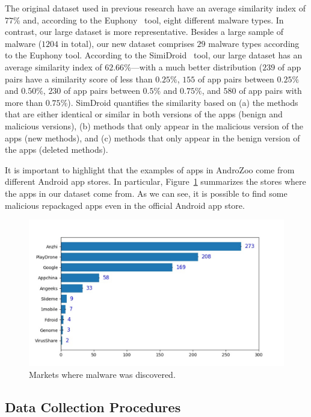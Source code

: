 The original dataset used in previous research have an average similarity index of $77\%$ and, according to the
Euphony~\cite{hurier2017euphony} tool, {\color{red}eight} different malware types. In contrast, our large dataset is more
representative. Besides a large sample of malware ($1204$ in total), our new dataset comprises {\color{red}$29$} malware types according to the Euphony tool. 
According to the SimiDroid~\cite{DBLP:conf/trustcom/0029BK17} tool,
our large dataset has an average similarity index of $62.66\%$---with a much better distribution ($239$ of
app pairs have a similarity score of less than $0.25\%$, $155$ of app pairs
between $0.25\%$ and $0.50\%$, $230$ of app pairs between $0.5\%$ and $0.75\%$,
and $580$ of app pairs with more than $0.75\%$). SimDroid quantifies the similarity
based on (a) the methods that are either identical or similar in both versions of the apps (benign and malicious versions),
(b) methods that only appear in the malicious version of the apps (new methods), and (c) methods that only appear in the
benign version of the apps (deleted methods).

It is important to highlight that the examples of apps in AndroZoo
come from different Android app stores. In particular,
Figure~\ref{fig:stores} summarizes the stores where the apps in our dataset come
from. As we can see, it is
possible to find some malicious repackaged apps
even in the official Android app store.


\begin{figure}[ht]
\centering
\includegraphics[scale=0.43]{images/stores.pdf}
\caption{Markets where malware was discovered.}
 \label{fig:stores}
\end{figure}


\subsection{Data Collection Procedures} \label{sec:dataCollectionProc}


